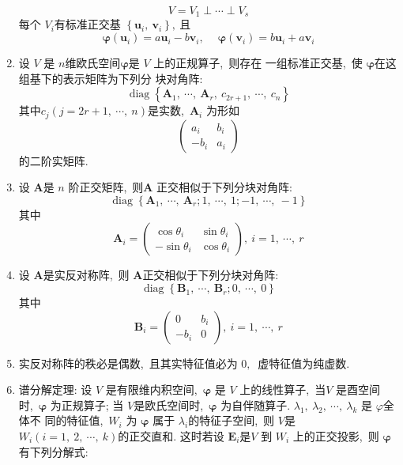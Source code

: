 \begin{enumerate}
		$$V=V_{1} \perp \cdots \perp V_{s}$$
		每个 $ V_{i}  $有标准正交基  $\left\{\boldsymbol{u}_{i},\  \boldsymbol{v}_{i}\right\} ,\  $且
		$$\boldsymbol{\varphi}\left(\boldsymbol{u}_{i}\right)=a \boldsymbol{u}_{i}-b \boldsymbol{v}_{i},\  \quad \boldsymbol{\varphi}\left(\boldsymbol{v}_{i}\right)=b \boldsymbol{u}_{i}+a \boldsymbol{v}_{i}$$
		\item 设 $ V $ 是 $ n  $维欧氏空间$\boldsymbol{\varphi} $是 $ V$  上的正规算子,\  则存在 一组标准正交基,\  使 $\boldsymbol{\varphi} $在这组基下的表示矩阵为下列分 块对角阵:
		$$\operatorname{diag}\left\{\boldsymbol{A}_{1},\  \cdots,\  \boldsymbol{A}_{r},\  c_{2 r+1},\  \cdots,\  c_{n}\right\}$$
		其中$  c_{j}(j=2 r+1,\  \cdots,\  n)  $是实数,\   $\boldsymbol{A}_{i}$  为形如
		$$\left(\begin{array}{cc}
			a_{i} & b_{i} \\
			-b_{i} & a_{i}
		\end{array}\right)$$
		的二阶实矩阵.
		\item 设 $ \boldsymbol{A}  $是  $n$  阶正交矩阵,\  则$  \boldsymbol{A}$  正交相似于下列分块对角阵:
		$$\operatorname{diag}\left\{\boldsymbol{A}_{1},\  \cdots,\  \boldsymbol{A}_{r} ; 1,\  \cdots,\  1 ;-1,\  \cdots,\ -1\right\}$$
		其中
		$$\boldsymbol{A}_{i}=\left(\begin{array}{cc}
			\cos \theta_{i} & \sin \theta_{i} \\
			-\sin \theta_{i} & \cos \theta_{i}
		\end{array}\right),\  i=1,\  \cdots,\  r$$
		\item 设 $\boldsymbol{A}$是实反对称阵,\  则  $\boldsymbol{A}$正交相似于下列分块对角阵:
		$$\operatorname{diag}\left\{\boldsymbol{B}_{1},\  \cdots,\  \boldsymbol{B}_{r} ; 0,\  \cdots,\  0\right\}$$
		其中
		$$\boldsymbol{B}_{i}=\left(\begin{array}{cc}
			0 & b_{i} \\
			-b_{i} & 0
		\end{array}\right),\  i=1,\  \cdots,\  r$$
		\item 实反对称阵的秩必是偶数,\  且其实特征值必为 $0 ,\ $ 虚特征值为纯虚数.
		\item 谱分解定理: 设 $ V $ 是有限维内积空间,\  $ \boldsymbol{\varphi}$  是  $V $ 上的线性算子,\ 当$  V$  是酉空间时,\   $\boldsymbol{\varphi}$ 为正规算子; 当 $ V$是欧氏空间时,\   $\boldsymbol{\varphi}$  为自伴随算子. $ \lambda_{1},\  \lambda_{2},\  \cdots,\  \lambda_{k}$  是  $\varphi  $全体不 同的特征值,\  $ W_{i}$  为  $\boldsymbol{\varphi}$ 属于  $\lambda_{i}  $的特征子空间,\  则 $ V  $是  $W_{i}(i=1,\ 2,\  \cdots,\  k)  $的正交直和. 这时若设 $\boldsymbol{E}_{i}  $是$  V$  到  $W_{i}$  上的正交投影,\  则 $\boldsymbol{\varphi} $有下列分解式:

\end{enumerate}
